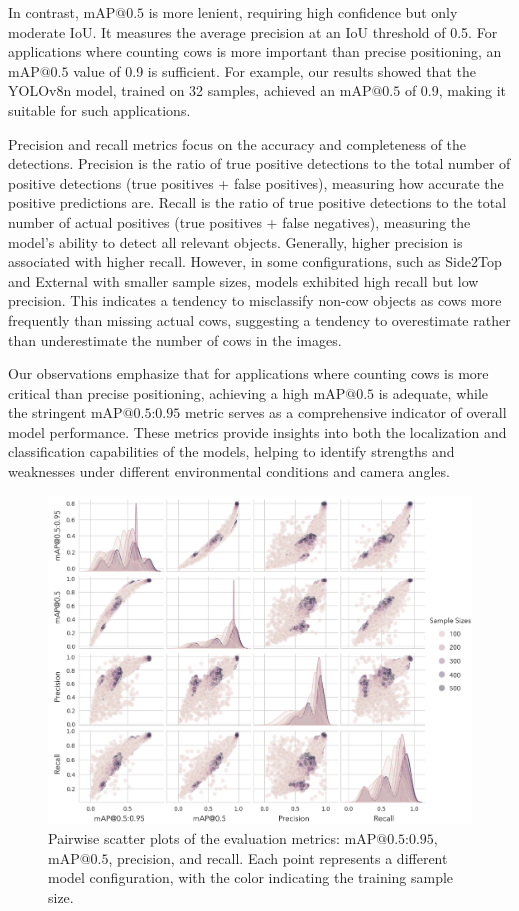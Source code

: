 In contrast, $\text{mAP@{0.5}}$ is more lenient, requiring high confidence but only moderate IoU. It measures the average precision at an IoU threshold of 0.5. For applications where counting cows is more important than precise positioning, an $\text{mAP@{0.5}}$ value of 0.9 is sufficient. For example, our results showed that the YOLOv8n model, trained on 32 samples, achieved an $\text{mAP@{0.5}}$ of 0.9, making it suitable for such applications.

Precision and recall metrics focus on the accuracy and completeness of the detections. Precision is the ratio of true positive detections to the total number of positive detections (true positives + false positives), measuring how accurate the positive predictions are. Recall is the ratio of true positive detections to the total number of actual positives (true positives + false negatives), measuring the model’s ability to detect all relevant objects. Generally, higher precision is associated with higher recall. However, in some configurations, such as Side2Top and External with smaller sample sizes, models exhibited high recall but low precision. This indicates a tendency to misclassify non-cow objects as cows more frequently than missing actual cows, suggesting a tendency to overestimate rather than underestimate the number of cows in the images.

Our observations emphasize that for applications where counting cows is more critical than precise positioning, achieving a high $\text{mAP@{0.5}}$ is adequate, while the stringent $\text{mAP@{0.5:0.95}}$ metric serves as a comprehensive indicator of overall model performance. These metrics provide insights into both the localization and classification capabilities of the models, helping to identify strengths and weaknesses under different environmental conditions and camera angles.

\begin{figure}[h]
    \centering
    \includegraphics[width=1\textwidth]{figure_s1.jpg}
    \caption{Pairwise scatter plots of the evaluation metrics: $\text{mAP@{0.5:0.95}}$, $\text{mAP@{0.5}}$, precision, and recall. Each point represents a different model configuration, with the color indicating the training sample size.}
    \label{fig:metrics}
\end{figure}

